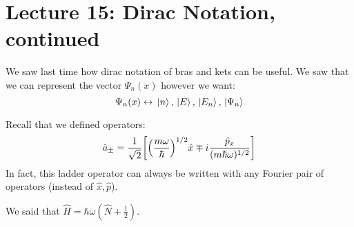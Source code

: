 \section{Lecture 15: Dirac Notation, continued}

We saw last time how dirac notation of bras and kets can be useful. We saw that we can represent
the vector $\Psi_n(x)$ however we want:
\[ \Psi_n(x) \leftrightarrow \ket*{n}, \ket*{E}, \ket*{E_n}, \ket*{\Psi_n}\]

Recall that we defined operators:
\[ \hat{a}_{\pm} = \frac{1}{\sqrt{2}} \qty[\qty(\frac{m\omega}{\hbar})^{1/2} \hat{x} \mp i \frac{\hat{p}_x}{(m\hbar \omega)^{1/2}}] \]
In fact, this ladder operator can always be written with any Fourier pair of operators (instead of $\hat{x}, \hat{p}$).

We said that $\hat{H} = \hbar \omega(\hat{N} + \frac{1}{2})$.

